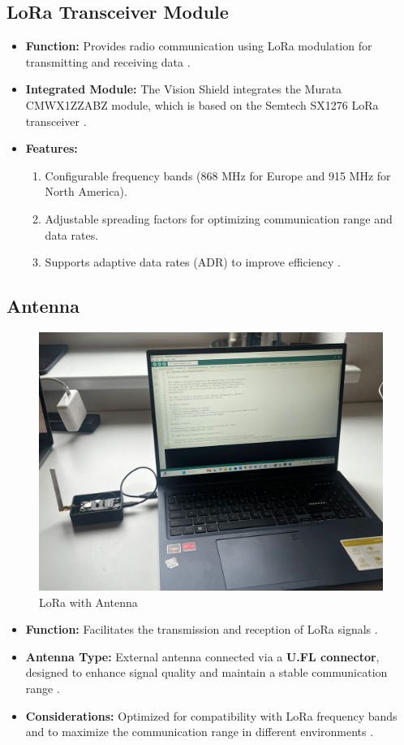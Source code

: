\subsection{LoRa Transceiver Module}
\begin{itemize}
	\item \textbf{Function:} Provides radio communication using LoRa modulation for transmitting and receiving data \cite{semtech_sx1276:2025}.
	\item \textbf{Integrated Module:} The Vision Shield integrates the Murata CMWX1ZZABZ module, which is based on the Semtech SX1276 LoRa transceiver \cite{murata_transceiver:2025}.
	\item \textbf{Features:} 
	\begin{enumerate}
		\item Configurable frequency bands (868 MHz for Europe and 915 MHz for North America).
		\item Adjustable spreading factors for optimizing communication range and data rates.
		\item Supports adaptive data rates (ADR) to improve efficiency \cite{semtech_sx1276:2025}.
	\end{enumerate}
\end{itemize}

\subsection{Antenna}

\begin{figure}
	\begin{center}
		\includegraphics[width=0.7\linewidth]{Images/LORA/LORA2.jpg}
		\caption{LoRa with Antenna}
		\label{LoRAWANRange} 
	\end{center}
\end{figure}

\begin{itemize}
	\item \textbf{Function:} Facilitates the transmission and reception of LoRa signals \cite{semtech_lora:2025}.
	\item \textbf{Antenna Type:} External antenna connected via a \textbf{U.FL connector}, designed to enhance signal quality and maintain a stable communication range \cite{murata_transceiver:2025}.
	\item \textbf{Considerations:} Optimized for compatibility with LoRa frequency bands and to maximize the communication range in different environments \cite{semtech_lora:2025}.
\end{itemize}

